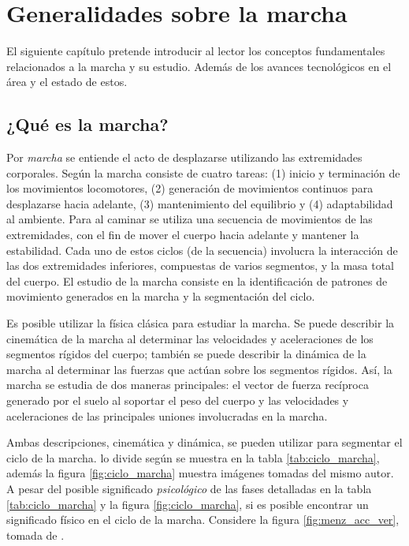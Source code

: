 \chapter[Generalidades]{Generalidades sobre la marcha}
\label{generalidades}

El siguiente capítulo pretende introducir al lector los conceptos fundamentales relacionados a la marcha y su estudio. Además de los avances tecnológicos en el área y el estado de estos.

\section{¿Qué es la marcha?}

Por \emph{marcha} se entiende el acto de desplazarse utilizando las extremidades corporales. Según \cite{menz} la marcha consiste de cuatro tareas: (1) inicio y terminación de los movimientos locomotores, (2) generación de movimientos continuos para desplazarse hacia adelante, (3) mantenimiento del equilibrio y (4) adaptabilidad al ambiente. Para \cite{perry} al caminar se utiliza una secuencia de movimientos de las extremidades, con el fin de mover el cuerpo hacia adelante y mantener la estabilidad. Cada uno de estos ciclos (de la secuencia) involucra la interacción de las dos extremidades inferiores, compuestas de varios segmentos, y la masa total del cuerpo. El estudio de la marcha consiste en la identificación de patrones de movimiento generados en la marcha y la segmentación del ciclo.

Es posible utilizar la física clásica para estudiar la marcha. Se puede describir la cinemática de la marcha al determinar las velocidades y aceleraciones de los segmentos rígidos del cuerpo; también se puede describir la dinámica de la marcha al determinar las fuerzas que actúan sobre los segmentos rígidos. Así, la marcha se estudia de dos maneras principales: el vector de fuerza recíproca generado por el suelo al soportar el peso del cuerpo y las velocidades y aceleraciones de las principales uniones involucradas en la marcha. \citep{perry}

Ambas descripciones, cinemática y dinámica, se pueden utilizar para segmentar el ciclo de la marcha. \cite{perry} lo divide según se muestra en la tabla \ref{tab:ciclo_marcha}, además la figura \ref{fig:ciclo_marcha} muestra imágenes tomadas del mismo autor. A pesar del posible significado \emph{psicológico} de las fases detalladas en la tabla \ref{tab:ciclo_marcha} y la figura \ref{fig:ciclo_marcha}, si es posible encontrar un significado físico en el ciclo de la marcha. Considere la figura \ref{fig:menz_acc_ver}, tomada de \citep{menz}.


